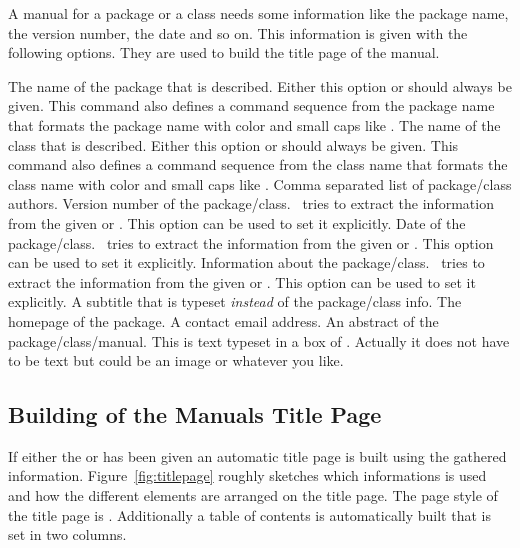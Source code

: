 \documentclass[load-preamble]{cnltx-doc}
\makeatletter
\def\cnltx{\cnltx@package@name@format{cnltx}}
\makeatother
\begin{document}
A manual for a package or a class needs some information like the package
name, the version number, the date and so on.  This information is given with
the following options.  They are used to build the title page of the manual.
\begin{options}
    The name of the package that is described.  Either this option or
     should always be given.  This command also defines a
    command sequence from the package name that formats the package name with
    color and small caps like \cnltx.
    The name of the class that is described.  Either this option or
     should always be given.  This command also defines a
    command sequence from the class name that formats the class name with
    color and small caps like \cnltx.
    Comma separated list of package/class authors.
    Version number of the package/class.  \cnltx\ tries to extract the
    information from the given  or .  This
    option can be used to set it explicitly.
    Date of the package/class.  \cnltx\ tries to extract the
    information from the given  or .  This
    option can be used to set it explicitly.
    Information about the package/class.  \cnltx\ tries to extract the
    information from the given  or .  This
    option can be used to set it explicitly.
    A subtitle that is typeset \emph{instead} of the package/class info.
    The homepage of the package.
    A contact email address.
    An abstract of the package/class/manual.  This is text typeset in a box of
    .  Actually it does not have to be text but could
      be an image or whatever you like.
\end{options}

\subsection{Building of the Manuals Title Page}

If either the  or  has been given an automatic
title page is built using the gathered information. Figure~\ref{fig:titlepage}
roughly sketches which informations is used and how the different elements are
arranged on the title page.  The page style of the title page is
.  Additionally a  table of contents is automatically built that
is set in two columns.
\end{document}

